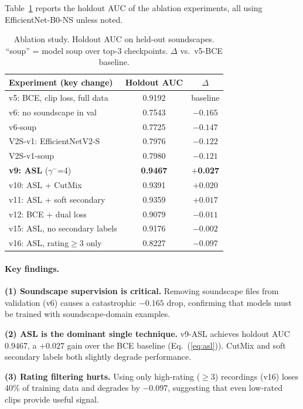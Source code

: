 \documentclass[10pt,twocolumn]{article}
\newcommand{\tabref}[1]{Table~\ref{#1}}
\newcommand{\eqnref}[1]{Eq.~(\ref{#1})}
\begin{document}
\tabref{tab:ablation} reports the holdout AUC of the ablation experiments,
all using EfficientNet-B0-NS unless noted.

\begin{table}[t]
\centering
\small
\caption{Ablation study. Holdout AUC on held-out soundscapes.
  ``soup'' = model soup over top-3 checkpoints.
  $\Delta$ vs.\ v5-BCE baseline.}
\label{tab:ablation}
\begin{tabular}{lcc}
\toprule
Experiment (key change)  & Holdout AUC & $\Delta$ \\
\midrule
v5: BCE, clip loss, full data  & 0.9192 & baseline \\
v6: no soundscape in val       & 0.7543 & $-0.165$ \\
v6-soup                        & 0.7725 & $-0.147$ \\
V2S-v1: EfficientNetV2-S       & 0.7976 & $-0.122$ \\
V2S-v1-soup                    & 0.7980 & $-0.121$ \\
\midrule
\textbf{v9: ASL} ($\gamma^-$=4)     & \textbf{0.9467} & \textbf{$+$0.027} \\
v10: ASL + CutMix              & 0.9391 & $+0.020$ \\
v11: ASL + soft secondary      & 0.9359 & $+0.017$ \\
v12: BCE + dual loss           & 0.9079 & $-0.011$ \\
v15: ASL, no secondary labels  & 0.9176 & $-0.002$ \\
v16: ASL, rating$\geq$3 only   & 0.8227 & $-0.097$ \\
\bottomrule
\end{tabular}
\end{table}

\paragraph{Key findings.}

\textbf{(1) Soundscape supervision is critical.}
Removing soundscape files from validation (v6) causes a catastrophic $-0.165$ drop,
confirming that models must be trained with soundscape-domain examples.

\textbf{(2) ASL is the dominant single technique.}
v9-ASL achieves holdout AUC 0.9467, a $+0.027$ gain over the BCE baseline
(\eqnref{eq:asl}).
CutMix and soft secondary labels both slightly degrade performance.

\textbf{(3) Rating filtering hurts.}
Using only high-rating ($\geq 3$) recordings (v16) loses 40\% of training data
and degrades by $-0.097$, suggesting that even low-rated clips provide
useful signal.
\end{document}
